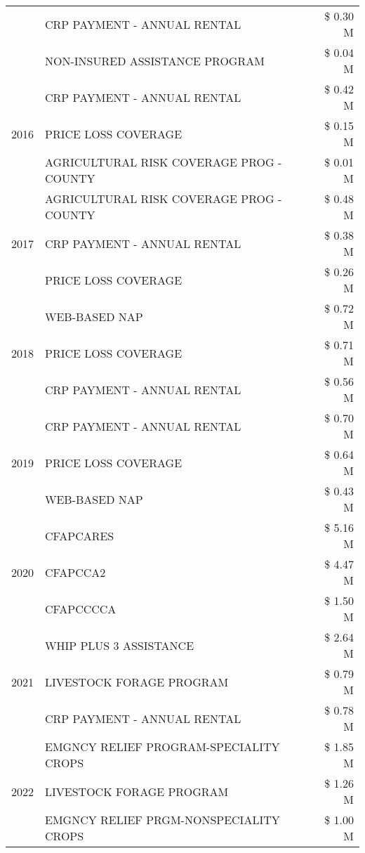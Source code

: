 \begin{tabular}{llr}
 & CRP PAYMENT - ANNUAL RENTAL & \$ 0.30 M \\
 & NON-INSURED ASSISTANCE PROGRAM & \$ 0.04 M \\
\cline{1-3}
\multirow[t]{3}{*}{2016} & CRP PAYMENT - ANNUAL RENTAL & \$ 0.42 M \\
 & PRICE LOSS COVERAGE & \$ 0.15 M \\
 & AGRICULTURAL RISK COVERAGE PROG - COUNTY & \$ 0.01 M \\
\cline{1-3}
\multirow[t]{3}{*}{2017} & AGRICULTURAL RISK COVERAGE PROG - COUNTY & \$ 0.48 M \\
 & CRP PAYMENT - ANNUAL RENTAL & \$ 0.38 M \\
 & PRICE LOSS COVERAGE & \$ 0.26 M \\
\cline{1-3}
\multirow[t]{3}{*}{2018} & WEB-BASED NAP & \$ 0.72 M \\
 & PRICE LOSS COVERAGE & \$ 0.71 M \\
 & CRP PAYMENT - ANNUAL RENTAL & \$ 0.56 M \\
\cline{1-3}
\multirow[t]{3}{*}{2019} & CRP PAYMENT - ANNUAL RENTAL & \$ 0.70 M \\
 & PRICE LOSS COVERAGE & \$ 0.64 M \\
 & WEB-BASED NAP & \$ 0.43 M \\
\cline{1-3}
\multirow[t]{3}{*}{2020} & CFAPCARES & \$ 5.16 M \\
 & CFAPCCA2 & \$ 4.47 M \\
 & CFAPCCCCA & \$ 1.50 M \\
\cline{1-3}
\multirow[t]{3}{*}{2021} & WHIP PLUS 3 ASSISTANCE & \$ 2.64 M \\
 & LIVESTOCK FORAGE PROGRAM & \$ 0.79 M \\
 & CRP PAYMENT - ANNUAL RENTAL & \$ 0.78 M \\
\cline{1-3}
\multirow[t]{3}{*}{2022} & EMGNCY RELIEF PROGRAM-SPECIALITY CROPS & \$ 1.85 M \\
 & LIVESTOCK FORAGE PROGRAM & \$ 1.26 M \\
 & EMGNCY RELIEF PRGM-NONSPECIALITY CROPS & \$ 1.00 M \\
\cline{1-3}
\bottomrule
\end{tabular}
